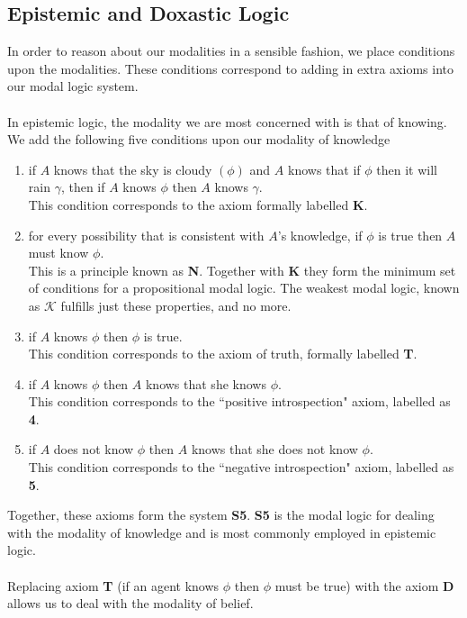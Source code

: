 \documentclass[12pt, a4paper, titlepage]{scrartcl}
\begin{document}
\subsection{Epistemic and Doxastic Logic}\label{epistemic_logics}
In order to reason about our modalities in a sensible fashion, we place
conditions upon the modalities.
These conditions correspond to adding in extra axioms into our modal logic
system. \citep{hoek2008dynamic}\\
\\
In epistemic logic, the modality we are most concerned with is that of knowing.
We add the following five conditions upon our modality of knowledge
\begin{enumerate}
	\item if $A$ knows that the sky is cloudy $(\phi)$ and $A$ knows that if
	$\phi$ then it will rain $\gamma$, then if $A$ knows $\phi$ then $A$ knows
	$\gamma$.\\
	This condition corresponds to the axiom formally labelled {\bf K}.
	\item for every possibility that is consistent with $A$'s knowledge, if $\phi$
	is true then $A$ must know $\phi$.\\
	This is a principle known as {\bf N}.
	Together with {\bf K} they form the minimum set of conditions for a
	propositional modal logic.
	The weakest modal logic, known as $\mathcal{K}$ fulfills just these
	properties, and no more.
	\item if $A$ knows $\phi$ then $\phi$ is true.\\
	This condition corresponds to the axiom of truth, formally labelled {\bf T}.
	\item if $A$ knows $\phi$ then $A$ knows that she knows $\phi$.\\
	This condition corresponds to the ``positive introspection" axiom, labelled 
	as {\bf 4}.
	\item if $A$ does not know $\phi$ then $A$ knows that she does not know
	$\phi$.\\
	This condition corresponds to the ``negative introspection" axiom, labelled 
	as {\bf 5}.
\end{enumerate}
Together, these axioms form the system {\bf S5}.
{\bf S5} is the modal logic for dealing with the modality of knowledge and is
most commonly employed in epistemic logic.\\
\\
Replacing axiom {\bf T} (if an agent knows $\phi$ then $\phi$ must be true) with
the axiom {\bf D} allows us to deal with the modality of belief.
\end{document}
